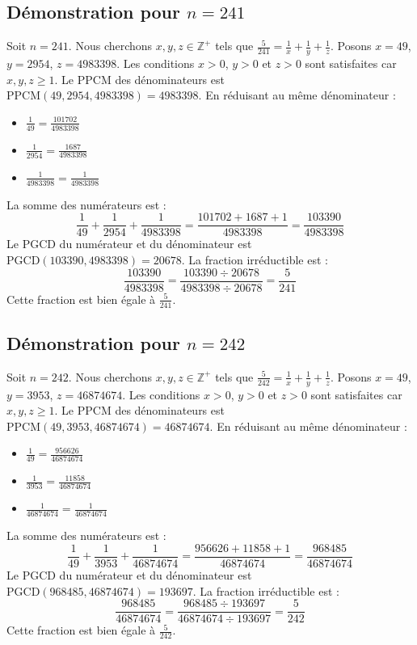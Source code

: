 \documentclass[11pt,a4paper]{article}
\begin{document}
\subsection{Démonstration pour $n = 241$}
Soit $n = 241$. Nous cherchons $x, y, z \in \mathbb{Z}^{+}$ tels que $\frac{5}{241} = \frac{1}{x} + \frac{1}{y} + \frac{1}{z}$.
Posons $x = 49$, $y = 2954$, $z = 4983398$.
Les conditions $x > 0$, $y > 0$ et $z > 0$ sont satisfaites car $x, y, z \geq 1$.
Le PPCM des dénominateurs est $\text{PPCM}(49, 2954, 4983398) = 4983398$.
En réduisant au même dénominateur :
\begin{itemize}
    \item $\frac{1}{49} = \frac{101702}{4983398}$
    \item $\frac{1}{2954} = \frac{1687}{4983398}$
    \item $\frac{1}{4983398} = \frac{1}{4983398}$
\end{itemize}
La somme des numérateurs est :
$$ \frac{1}{49} + \frac{1}{2954} + \frac{1}{4983398} = \frac{101702 + 1687 + 1}{4983398} = \frac{103390}{4983398} $$
Le PGCD du numérateur et du dénominateur est $\text{PGCD}(103390, 4983398) = 20678$.
La fraction irréductible est :
$$ \frac{103390}{4983398} = \frac{103390 \div 20678}{4983398 \div 20678} = \frac{5}{241} $$
Cette fraction est bien égale à $\frac{5}{241}$.

\subsection{Démonstration pour $n = 242$}
Soit $n = 242$. Nous cherchons $x, y, z \in \mathbb{Z}^{+}$ tels que $\frac{5}{242} = \frac{1}{x} + \frac{1}{y} + \frac{1}{z}$.
Posons $x = 49$, $y = 3953$, $z = 46874674$.
Les conditions $x > 0$, $y > 0$ et $z > 0$ sont satisfaites car $x, y, z \geq 1$.
Le PPCM des dénominateurs est $\text{PPCM}(49, 3953, 46874674) = 46874674$.
En réduisant au même dénominateur :
\begin{itemize}
    \item $\frac{1}{49} = \frac{956626}{46874674}$
    \item $\frac{1}{3953} = \frac{11858}{46874674}$
    \item $\frac{1}{46874674} = \frac{1}{46874674}$
\end{itemize}
La somme des numérateurs est :
$$ \frac{1}{49} + \frac{1}{3953} + \frac{1}{46874674} = \frac{956626 + 11858 + 1}{46874674} = \frac{968485}{46874674} $$
Le PGCD du numérateur et du dénominateur est $\text{PGCD}(968485, 46874674) = 193697$.
La fraction irréductible est :
$$ \frac{968485}{46874674} = \frac{968485 \div 193697}{46874674 \div 193697} = \frac{5}{242} $$
Cette fraction est bien égale à $\frac{5}{242}$.
\end{document}
